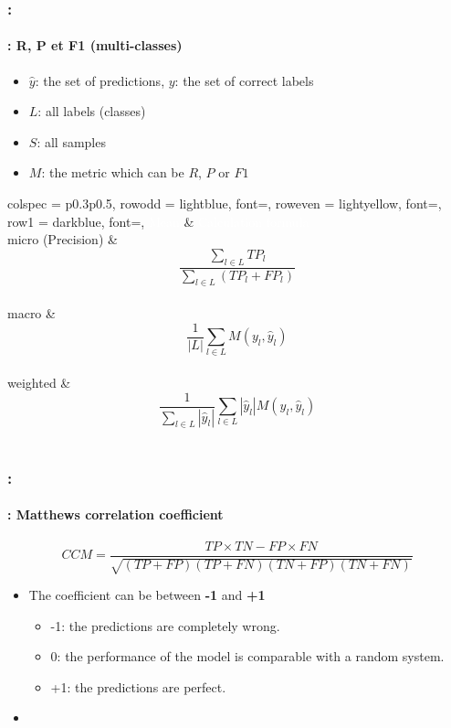 \documentclass[xcolor=table]{beamer}
\begin{document}
\begin{frame}
	\frametitle{\insertshortsubtitle: \insertsection}
	\framesubtitle{\insertsubsection: R, P et F1 (multi-classes)}

	\begin{itemize}
		\item $\hat{y}$: the set of predictions, $y$: the set of correct labels
		\item $L$: all labels (classes)
		\item $S$: all samples
		\item $M$: the metric which can be $R$, $P$ or $F1$
	\end{itemize}

	\begin{center}
		\begin{tblr}{
				colspec = {p{0.3\textwidth}p{0.5\textwidth}},
				row{odd} = {lightblue, font=\small},
				row{even} = {lightyellow, font=\small},
				row{1} = {darkblue, font=\bfseries},
			}
			\textcolor{white}{Mean} & \textcolor{white}{Calculation formula} \\
			micro (Precision) & \vspace{-6pt}\[\frac{\sum_{l \in L} TP_l}{\sum_{l \in L} (TP_l + FP_l)}\]\vspace{-6pt} \\
			macro & \vspace{-6pt}\[\frac{1}{|L|} \sum_{l \in L} M(y_l, \hat{y}_l)\]\vspace{-6pt}\\
			weighted & \vspace{-6pt}\[\frac{1}{\sum_{l \in L} |\hat{y}_l|} \sum_{l \in L} |\hat{y}_l| M(y_l, \hat{y}_l)\]\vspace{-6pt} \\
		\end{tblr}
	\end{center}
	
\end{frame}

\begin{frame}
	\frametitle{\insertshortsubtitle: \insertsection}
	\framesubtitle{\insertsubsection: Matthews correlation coefficient}
	
	\[CCM = \frac{TP \times TN - FP \times FN}{\sqrt{(TP + FP)(TP + FN)(TN + FP)(TN + FN)}}\]
	\begin{itemize}
		\item The coefficient can be between \textbf{-1} and \textbf{+1}
		\begin{itemize}
			\item -1: the predictions are completely wrong.
			\item 0: the performance of the model is comparable with a random system.
			\item +1: the predictions are perfect.
		\end{itemize}
		\item {}
	\end{itemize}
		
\end{frame}
\end{document}
